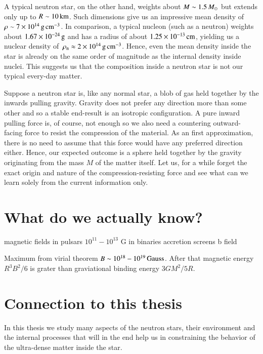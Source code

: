A typical neutron star, on the other hand, weights about $M \sim 1.5\, M_{\odot}$ but extends only up to $R \sim 10\, \mathrm{km}$.
Such dimensions give us an impressive mean density of $\rho \sim 7 \times 10^{14} \, \mathrm{g}\,\mathrm{cm}^{-3} $.
In comparison, a typical nucleon (such as a neutron) weights about $1.67 \times 10^{-24} \, \mathrm{g}$ and has a radius of about $1.25 \times 10^{-13} \, \mathrm{cm}$, yielding us a nuclear density of $\, \rho_{\mathrm{n}}  \approx 2 \times 10^{14} \, \mathrm{g}\,\mathrm{cm}^{-3} $.
Hence, even the mean density inside the star is already on the same order of magnitude as the internal density inside nuclei.
This suggests us that the composition inside a neutron star is not our typical every-day matter.


Suppose a neutron star is, like any normal star, a blob of gas held together by the inwards pulling gravity.
Gravity does not prefer any direction more than some other and so a stable end-result is an isotropic configuration.
A pure inward pulling force is, of course, not enough so we also need a countering outward-facing force to resist the compression of the material.
As an first approximation, there is no need to assume that this force would have any preferred direction either.
Hence, our expected outcome is a sphere held together by the gravity originating from the mass $M$ of the matter itself.
Let us, for a while forget the exact origin and nature of the compression-resisting force and see what can we learn solely from the current information only.

\section{What do we actually know?}


magnetic fields in pulsars $10^{11} - 10^{13}$ G \cite{MHT05}
in binaries accretion screens b field \cite{CZB01}

Maximum from virial theorem $B \sim 10^{18} - 10^{19}\, \mathrm{Gauss}$.
After that magnetic energy $R^3 B^2 / 6$ is grater than graviational binding energy $3 G M^2 / 5 R$.\cite{CF53,ST83,LS91}


%
%




\section{Connection to this thesis}
In this thesis we study many aspects of the neutron stars, their environment and the internal processes that will in the end help us in constraining the behavior of the ultra-dense matter inside the star.
